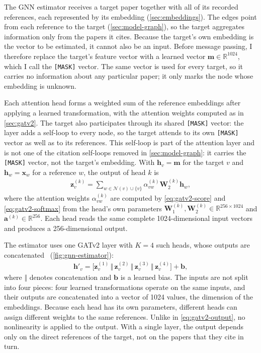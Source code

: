 The GNN estimator receives a target paper together with all of its recorded references, each represented by its embedding (\autoref{sec:embeddings}). The edges point from each reference to the target (\autoref{sec:model-graph}), so the target aggregates information only from the papers it cites. Because the target's own embedding is the vector to be estimated, it cannot also be an input. Before message passing, I therefore replace the target's feature vector with a learned vector $\mathbf{m} \in \mathbb{R}^{1024}$, which I call the \texttt{[MASK]} vector. The same vector is used for every target, so it carries no information about any particular paper; it only marks the node whose embedding is unknown.

Each attention head forms a weighted sum of the reference embeddings after applying a learned transformation, with the attention weights computed as in \autoref{sec:gatv2}. The target also participates through its shared \texttt{[MASK]} vector: the layer adds a self-loop to every node, so the target attends to its own \texttt{[MASK]} vector as well as to its references. This self-loop is part of the attention layer and is not one of the citation self-loops removed in \autoref{sec:model-graph}: it carries the \texttt{[MASK]} vector, not the target's embedding. With $\mathbf{h}_v = \mathbf{m}$ for the target $v$ and $\mathbf{h}_w = \mathbf{x}_w$ for a reference $w$, the output of head $k$ is
\begin{align}
  \mathbf{z}^{(k)}_v = \sum_{w \in \mathcal{N}(v) \cup \{v\}} \alpha^{(k)}_{vw} \mathbf{W}^{(k)}_2 \mathbf{h}_w,
  \label{eq:gnn-head}
\end{align}
where the attention weights $\alpha^{(k)}_{vw}$ are computed by \autoref{eq:gatv2-score} and \eqref{eq:gatv2-softmax} from the head's own parameters $\mathbf{W}^{(k)}_1, \mathbf{W}^{(k)}_2 \in \mathbb{R}^{256 \times 1024}$ and $\mathbf{a}^{(k)} \in \mathbb{R}^{256}$. Each head reads the same complete 1024-dimensional input vectors and produces a 256-dimensional output.

The estimator uses one GATv2 layer with $K = 4$ such heads, whose outputs are concatenated~\cite{velickovic2018graph} (\autoref{fig:gnn-estimator}):
\begin{align}
  \mathbf{h}'_v = \big[\mathbf{z}^{(1)}_v \,\Vert\, \mathbf{z}^{(2)}_v \,\Vert\, \mathbf{z}^{(3)}_v \,\Vert\, \mathbf{z}^{(4)}_v\big] + \mathbf{b},
  \label{eq:gnn-heads}
\end{align}
where $\Vert$ denotes concatenation and $\mathbf{b}$ is a learned bias. The inputs are not split into four pieces: four learned transformations operate on the same inputs, and their outputs are concatenated into a vector of 1024 values, the dimension of the embeddings. Because each head has its own parameters, different heads can assign different weights to the same references. Unlike in \autoref{eq:gatv2-output}, no nonlinearity is applied to the output. With a single layer, the output depends only on the direct references of the target, not on the papers that they cite in turn.

